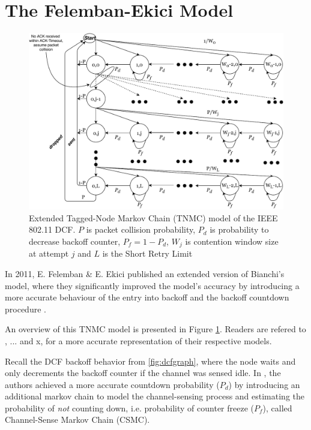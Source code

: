 \section{The Felemban-Ekici Model}

\begin{figure}
\center
\includegraphics[width=1\textwidth]{images/tnmc-dcf.pdf}
\caption{Extended Tagged-Node Markov Chain (TNMC) model of the IEEE 802.11 DCF. $P$ is packet collision probability, $P_d$ is probability to decrease backoff counter, $P_f = 1 - P_d$, $W_j$ is contention window size at attempt $j$ and $L$ is the Short Retry Limit}
\label{fig:tnmc}
\end{figure}

In 2011, E. Felemban \& E. Ekici published an extended version of Bianchi's model, where they significantly improved the model's accuracy by introducing a more accurate behaviour of the entry into backoff and the backoff countdown procedure \cite{felemban}.

An overview of this TNMC model is presented in Figure \ref{fig:tnmc}. Readers
are refered to \cite{bianchi}, ... and x, for a more accurate representation
of their respective models.

Recall the DCF backoff behavior from \ref{fig:dcfgraph}, where the node waits
and only decrements the backoff counter if the channel was sensed idle. In
\cite{felemban}, the authors achieved a more accurate countdown probability
($P_d$) by introducing an additional markov chain to model the channel-sensing
process and estimating the probability of \emph{not} counting down, i.e.
probability of counter freeze ($P_f$), called Channel-Sense Markov Chain
(CSMC).

